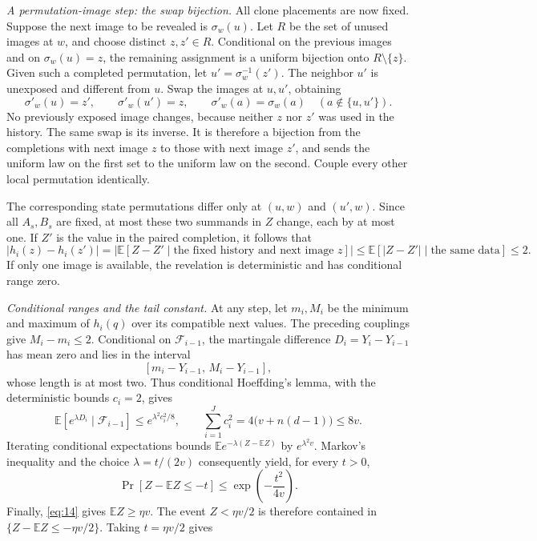 \documentclass[11pt]{article}
\theoremstyle{definition}
\theoremstyle{remark}
\numberwithin{equation}{section}
\begin{document}
\emph{A permutation-image step: the swap bijection.}
All clone placements are now fixed. Suppose the next image to
be revealed is \(\sigma_w(u)\). Let \(R\) be the set of unused
images at \(w\), and choose distinct \(z,z'\in R\). Conditional
on the previous images and on \(\sigma_w(u)=z\), the remaining
assignment is a uniform bijection onto \(R\setminus\{z\}\).
Given such a completed permutation, let
\(u'=\sigma_w^{-1}(z')\). The neighbor \(u'\) is unexposed and
different from \(u\). Swap the images at \(u,u'\), obtaining
\[
 \sigma'_w(u)=z',\qquad \sigma'_w(u')=z,\qquad
 \sigma'_w(a)=\sigma_w(a)\quad(a\notin\{u,u'\}).
\]
No previously exposed image changes, because neither \(z\) nor
\(z'\) was used in the history. The same swap is its inverse.
It is therefore a bijection from the completions with next
image \(z\) to those with next image \(z'\), and sends the
uniform law on the first set to the uniform law on the second.
Couple every other local permutation identically.

The corresponding state permutations differ only at
\((u,w)\) and \((u',w)\). Since all \(A_s,B_s\) are fixed,
at most these two summands in \(Z\) change, each by at most one.
If \(Z'\) is the value in the paired completion, it follows that
\[
 |h_i(z)-h_i(z')|
 =|\mathbb E[Z-Z'\mid\text{the fixed history and next image }z]|
 \le\mathbb E[|Z-Z'|\mid\text{the same data}]\le2.
\]
If only one image is available, the revelation is deterministic
and has conditional range zero.

\emph{Conditional ranges and the tail constant.}
At any step, let \(m_i,M_i\) be the minimum and maximum of
\(h_i(q)\) over its compatible next values. The preceding
couplings give \(M_i-m_i\le2\). Conditional on
\(\mathcal F_{i-1}\), the martingale difference
\(D_i=Y_i-Y_{i-1}\) has mean zero and lies in the interval
\[
 [m_i-Y_{i-1},\,M_i-Y_{i-1}],
\]
whose length is at most two. Thus conditional Hoeffding's
lemma, with the deterministic bounds \(c_i=2\), gives
\[
 \mathbb E[e^{\lambda D_i}\mid\mathcal F_{i-1}]
 \le e^{\lambda^2c_i^2/8},\qquad
 \sum_{i=1}^Jc_i^2=4\bigl(v+n(d-1)\bigr)\le8v.
\]
Iterating conditional expectations bounds
\(\mathbb E e^{-\lambda(Z-\mathbb EZ)}\) by
\(e^{\lambda^2v}\). Markov's inequality and the choice
\(\lambda=t/(2v)\) consequently yield, for every \(t>0\),
\[
 \Pr[Z-\mathbb EZ\le-t]\le
 \exp\!\left(-\frac{t^2}{4v}\right).
\]
Finally, \eqref{eq:14} gives \(\mathbb EZ\ge\eta v\).
The event \(Z<\eta v/2\) is therefore contained in
\(\{Z-\mathbb EZ\le-\eta v/2\}\). Taking \(t=\eta v/2\) gives
\end{document}
